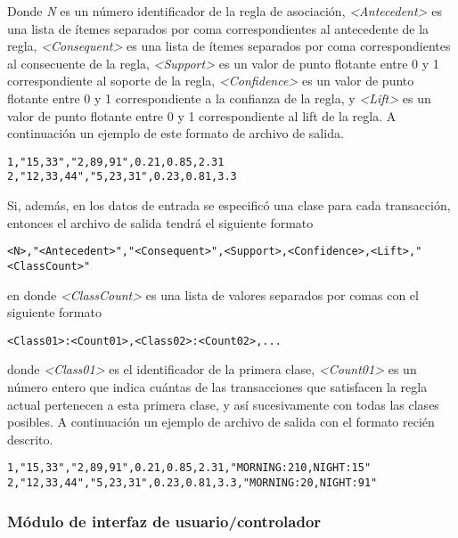Donde \textit{N} es un número identificador de la regla de asociación, \textit{<Antecedent>} es una lista de ítemes separados por coma correspondientes al antecedente de la regla, \textit{<Consequent>} es una lista de ítemes separados por coma correspondientes al consecuente de la regla, \textit{<Support>} es un valor de punto flotante entre 0 y 1 correspondiente al soporte de la regla, \textit{<Confidence>} es un valor de punto flotante entre 0 y 1 correspondiente a la confianza de la regla, y \textit{<Lift>} es un valor de punto flotante entre 0 y 1 correspondiente al lift de la regla. A continuación un ejemplo de este formato de archivo de salida.

\begin{lstlisting}[basicstyle=\ttfamily]
1,"15,33","2,89,91",0.21,0.85,2.31
2,"12,33,44","5,23,31",0.23,0.81,3.3
\end{lstlisting}

Si, además, en los datos de entrada se especificó una clase para cada transacción, entonces el archivo de salida tendrá el siguiente formato

\begin{lstlisting}[basicstyle=\ttfamily]
<N>,"<Antecedent>","<Consequent>",<Support>,<Confidence>,<Lift>,"<ClassCount>"
\end{lstlisting}

en donde \textit{<ClassCount>} es una lista de valores separados por comas con el siguiente formato

\begin{lstlisting}[basicstyle=\ttfamily]
<Class01>:<Count01>,<Class02>:<Count02>,...
\end{lstlisting}

donde \textit{<Class01>} es el identificador de la primera clase, \textit{<Count01>} es un número entero que indica cuántas de las transacciones que satisfacen la regla actual pertenecen a esta primera clase, y así sucesivamente con todas las clases posibles. A continuación un ejemplo de archivo de salida con el formato recién descrito.

\begin{lstlisting}[basicstyle=\ttfamily]
1,"15,33","2,89,91",0.21,0.85,2.31,"MORNING:210,NIGHT:15"
2,"12,33,44","5,23,31",0.23,0.81,3.3,"MORNING:20,NIGHT:91"
\end{lstlisting}

\subsubsection{Módulo de interfaz de usuario/controlador}

